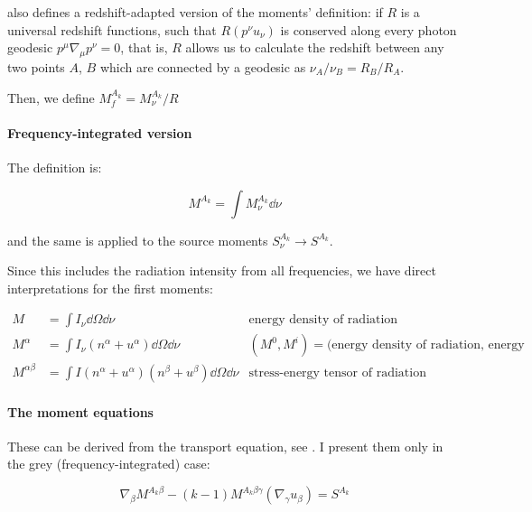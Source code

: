 \documentclass[main.tex]{subfiles}
\begin{document}
\textcite[]{Thorne:1981feb} also defines a redshift-adapted version of the moments' definition: if \(R\) is a universal redshift functions, such that \(R (p^\nu u_\nu)\) is conserved along every photon geodesic \(p^\mu \nabla_\mu p^\nu = 0\), that is, \(R\) allows us to calculate the redshift between any two points \(A\), \(B\) which are connected by a geodesic as \(\nu_A / \nu_B = R_B / R_A\).

Then, we define \( M_f ^{A_k} =  M_{\nu} ^{A_k} / R\)

\paragraph{Frequency-integrated version}

The definition is:

\begin{equation}
   M ^{A_k} = \int   M^{A_k} _\nu \dd{\nu}
\end{equation}

and the same is applied to the source moments \(S_\nu^{A_k} \rightarrow S^{A_k}\).

Since this includes the radiation intensity from all frequencies, we have direct interpretations for the first moments:

\begin{subequations}
\begin{align}
   M &= \int  I_\nu \dd{\Omega} \dd{\nu}   & \text{energy density of radiation}  \\
   M^\alpha &= \int I_\nu (n^\alpha + u^\alpha)\dd{\Omega} \dd{\nu}   & (M^0, M^i) = \text{(energy density of radiation, energy flux)}  \\
   M^{\alpha\beta} &= \int I (n^\alpha + u^\alpha)(n^\beta + u^\beta)\dd{\Omega} \dd{\nu}   & \text{stress-energy tensor of radiation}
\end{align}
\end{subequations}

\paragraph{The moment equations}

These can be derived from the transport equation, see \cite[3.14]{Thorne:1981feb}. I present them only in the grey (frequency-integrated) case:

\begin{equation} \label{eq:grey-moment-equations}
  \nabla_\beta M^{A_k \beta} - (k-1) M^{A_k \beta \gamma} (\nabla_ \gamma u_\beta)= S^{A_k}
\end{equation}
\end{document}
